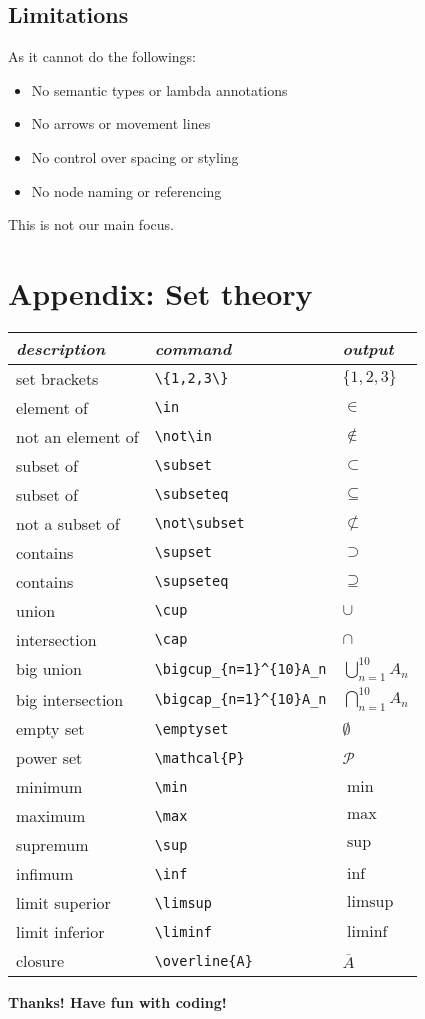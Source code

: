 \documentclass[a4paper,12pt]{article}
\begin{document}
\begin{spacing}{1.5}
\subsection{Limitations}
As it cannot do the followings:
\begin{itemize}
    \item No semantic types or lambda annotations
    \item No arrows or movement lines
    \item No control over spacing or styling
    \item No node naming or referencing
\end{itemize}
This is not our main focus.
\section{Appendix: Set theory}

\begin{center} 
\begin{tabular}{lll}
\toprule
\emph{description} & \emph{command} & \emph{output}\\
\midrule
set brackets & \verb!\{1,2,3\}! & $\{1,2,3\}$\\
element of & \verb!\in! & $\in$\\
not an element of & \verb!\not\in! & $\not\in$\\
subset of & \verb!\subset! & $\subset$\\
subset of & \verb!\subseteq! & $\subseteq$\\
not a subset of & \verb!\not\subset! & $\not\subset$\\
contains & \verb!\supset! & $\supset$\\
contains & \verb!\supseteq! & $\supseteq$\\
union & \verb!\cup! & $\cup$\\
intersection & \verb!\cap! & $\cap$\\
big union & 
\verb!\bigcup_{n=1}^{10}A_n! &
$ \bigcup_{n=1}^{10}A_{n}$\\
\addlinespace
big intersection & \verb!\bigcap_{n=1}^{10}A_n! &$ \bigcap_{n=1}^{10}A_{n}$\\
empty set & \verb!\emptyset! & $\emptyset$\\
power set & \verb!\mathcal{P}! & $\mathcal{P}$\\
minimum & \verb!\min! & $\min$\\
maximum & \verb!\max! & $\max$\\
supremum & \verb!\sup! & $\sup$\\
infimum & \verb!\inf! & $\inf$\\
limit superior & \verb!\limsup! & $\limsup$\\
limit inferior & \verb!\liminf! & $\liminf$\\
closure & \verb!\overline{A}! & $\overline{A}$\\
\bottomrule
\end{tabular}
\end{center}

\end{spacing}
\begin{center}
    \Huge
    \textbf{Thanks! Have fun with coding!}
\end{center}
\end{document}
